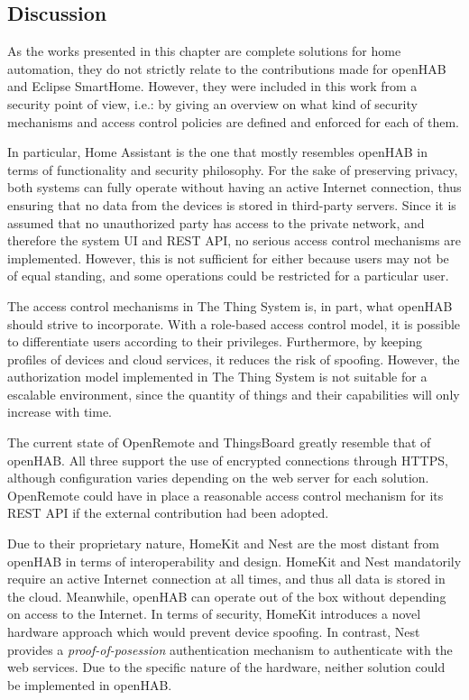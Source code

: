 \documentclass[12pt]{article}
\begin{document}
\subsection{Discussion}

As the works presented in this chapter are complete solutions for home automation, they do not strictly relate to the contributions made for openHAB and Eclipse SmartHome. However, they were included in this work from a security point of view, i.e.: by giving an overview on what kind of security mechanisms and access control policies are defined and enforced for each of them.

In particular, Home Assistant is the one that mostly resembles openHAB in terms of functionality and security philosophy. For the sake of preserving privacy, both systems can fully operate without having an active Internet connection, thus ensuring that no data from the devices is stored in third-party servers. Since it is assumed that no unauthorized party has access to the private network, and therefore the system UI and REST API, no serious access control mechanisms are implemented. However, this is not sufficient for either because users may not be of equal standing, and some operations could be restricted for a particular user.

The access control mechanisms in The Thing System is, in part, what openHAB should strive to incorporate. With a role-based access control model, it is possible to differentiate users according to their privileges. Furthermore, by keeping profiles of devices and cloud services, it reduces the risk of spoofing. However, the authorization model implemented in The Thing System is not suitable for a escalable environment, since the quantity of things and their capabilities will only increase with time.

The current state of OpenRemote and ThingsBoard greatly resemble that of openHAB. All three support the use of encrypted connections through HTTPS, although configuration varies depending on the web server for each solution. OpenRemote could have in place a reasonable access control mechanism for its REST API if the external contribution had been adopted.

Due to their proprietary nature, HomeKit and Nest are the most distant from openHAB in terms of interoperability and design. HomeKit and Nest mandatorily require an active Internet connection at all times, and thus all data is stored in the cloud. Meanwhile, openHAB can operate out of the box without depending on access to the Internet. In terms of security, HomeKit introduces a novel hardware approach which would prevent device spoofing. In contrast, Nest provides a \emph{proof-of-posession} authentication mechanism to authenticate with the web services. Due to the specific nature of the hardware, neither solution could be implemented in openHAB.
\end{document}
